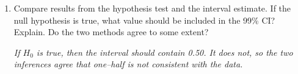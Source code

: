 \begin{enumerate}
\begin{enumerate}
\begin{enumerate}
     \item Compute a 99\% confidence interval.
\begin{students}
    \vspace{2.2cm}    
\end{students}

\begin{key} 
  $  (0.532, 0.742)$
\end{key}
     \item Explain what the word ``confidence'' means for this
       situation.
\begin{students}
\vspace{2cm}
\end{students}

\begin{key} 
  {\it Our confidence is in the process, not in just one interval. If
    we repeat the process (gather a new random sample) over and over,
    99\% of the intervals we create will include the true parameter of
  interest.}
\end{key}

  \end{enumerate}
\item Compare results from the hypothesis test and the interval
  estimate.  If the null hypothesis is true, what value should be
  included in the 99\% CI?  Explain. Do the two methods agree to some
  extent? 
\begin{students}
    \vspace{3.2cm}    
\end{students}

\begin{key} 
  {\it  If $H_0$ is true, then the interval should contain 0.50.  It
    does not, so the two inferences agree that one--half is not
    consistent with the data.} 
\end{key}

    \end{enumerate}
  \end{enumerate}
  

